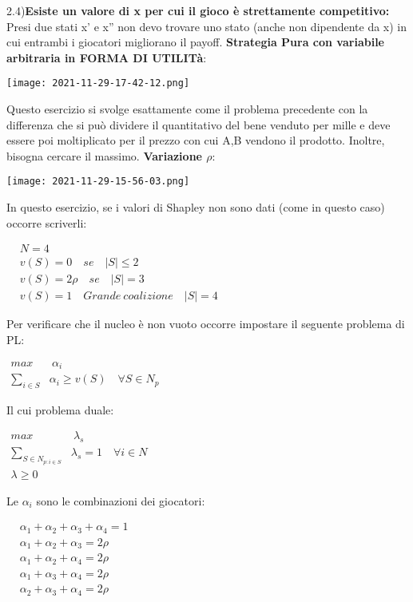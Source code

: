 \documentclass{article}
\theoremstyle{definition}
\theoremstyle{remark}
\begin{document}
2.4)\textbf{Esiste un valore di x per cui il gioco è strettamente competitivo:} Presi due stati x' e x'' non devo trovare uno stato (anche non dipendente da x) in cui entrambi i giocatori migliorano il payoff.
\textbf{Strategia Pura con variabile arbitraria in FORMA DI UTILITà}:
\begin{center}
    \texttt{[image: 2021-11-29-17-42-12.png]}
\end{center}
Questo esercizio si svolge esattamente come il problema precedente con la differenza che si può dividere il quantitativo del bene venduto per mille e deve essere poi moltiplicato
per il prezzo con cui A,B vendono il prodotto. Inoltre, bisogna cercare il massimo.\newline
\textbf{Variazione \(\rho\)}:
\begin{center}
    \texttt{[image: 2021-11-29-15-56-03.png]}
\end{center}
In questo esercizio, se i valori di Shapley non sono dati (come in questo caso) occorre scriverli:
\begin{center}
    $\begin{aligned}
        & N=4 \\
        & v(S)=0\quad se\quad |S|\leq 2 \\
        & v(S)=2\rho\quad se\quad |S|=3 \\
        & v(S)=1\quad Grande\ coalizione\quad |S|=4
    \end{aligned}$
\end{center}
Per verificare che il nucleo è non vuoto occorre impostare il seguente problema di PL:
\begin{center}
    $\begin{aligned}
        max &\ \alpha_i\\
        \sum_{i\in S}& \alpha_i\geq v(S)\quad \forall S\in N_p
    \end{aligned}$
\end{center}
Il cui problema duale:
\begin{center}
    $\begin{aligned}
        max &\ \lambda_s\\
        \sum_{S\in N_{p:i\in S}}& \lambda_s= 1\quad \forall i\in N\\
        \lambda\geq 0
    \end{aligned}$
\end{center}
Le \(\alpha_i\) sono le combinazioni dei giocatori:
\begin{center}
    $\begin{aligned}
        & \alpha_1+\alpha_2+\alpha_3+\alpha_4=1\\
        & \alpha_1 +\alpha_2+\alpha_3=2\rho\\
        & \alpha_1 +\alpha_2+\alpha_4=2\rho\\
        & \alpha_1 +\alpha_3+\alpha_4=2\rho\\
        & \alpha_2 +\alpha_3+\alpha_4=2\rho\\
    \end{aligned}$
\end{center}
\end{document}
